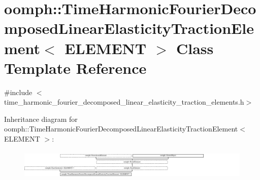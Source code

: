 \hypertarget{classoomph_1_1TimeHarmonicFourierDecomposedLinearElasticityTractionElement}{}\section{oomph\+:\+:Time\+Harmonic\+Fourier\+Decomposed\+Linear\+Elasticity\+Traction\+Element$<$ E\+L\+E\+M\+E\+NT $>$ Class Template Reference}
\label{classoomph_1_1TimeHarmonicFourierDecomposedLinearElasticityTractionElement}


{\ttfamily \#include $<$time\+\_\+harmonic\+\_\+fourier\+\_\+decomposed\+\_\+linear\+\_\+elasticity\+\_\+traction\+\_\+elements.\+h$>$}

Inheritance diagram for oomph\+:\+:Time\+Harmonic\+Fourier\+Decomposed\+Linear\+Elasticity\+Traction\+Element$<$ E\+L\+E\+M\+E\+NT $>$\+:\begin{figure}[H]
\begin{center}
\leavevmode
\includegraphics[height=1.447028cm]{classoomph_1_1TimeHarmonicFourierDecomposedLinearElasticityTractionElement}
\end{center}
\end{figure}
